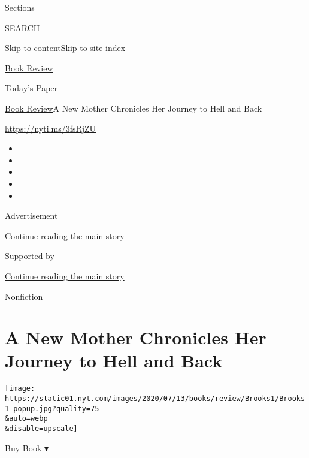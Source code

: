 Sections

SEARCH

\protect\hyperlink{site-content}{Skip to
content}\protect\hyperlink{site-index}{Skip to site index}

\href{https://www.nytimes.com/section/books/review}{Book Review}

\href{https://myaccount.nytimes.com/auth/login?response_type=cookie\&client_id=vi}{}

\href{https://www.nytimes.com/section/todayspaper}{Today's Paper}

\href{/section/books/review}{Book Review}\textbar{}A New Mother
Chronicles Her Journey to Hell and Back

\url{https://nyti.ms/3fsRjZU}

\begin{itemize}
\item
\item
\item
\item
\item
\end{itemize}

Advertisement

\protect\hyperlink{after-top}{Continue reading the main story}

Supported by

\protect\hyperlink{after-sponsor}{Continue reading the main story}

Nonfiction

\hypertarget{a-new-mother-chronicles-her-journey-to-hell-and-back}{%
\section{A New Mother Chronicles Her Journey to Hell and
Back}\label{a-new-mother-chronicles-her-journey-to-hell-and-back}}

\texttt{[image: https://static01.nyt.com/images/2020/07/13/books/review/Brooks1/Brooks1-popup.jpg?quality=75\\\&auto=webp\\\&disable=upscale]}

Buy Book ▾

